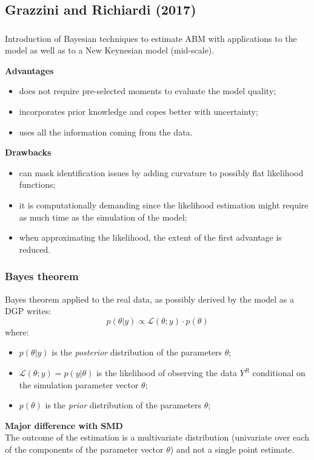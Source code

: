 \documentclass[10pt]{beamer}
\begin{document}
\subsection{Grazzini and Richiardi (2017)}


\begin{frame}[c]\frametitle{\citet{grazzini2017bayesian}}
	Introduction of Bayesian techniques to estimate ABM with applications to the \citet{cliff1997minimal} model as well as to a New Keynesian model (mid-scale). \bigskip

	\alert{\textbf{Advantages}}
	\begin{itemize}
		\item does not require pre-selected moments to evaluate the model quality;
		\item incorporates prior knowledge and copes better with uncertainty;
		\item uses all the information coming from the data. %
	\end{itemize}

	\alert{\textbf{Drawbacks}}
	\begin{itemize}
		\item can mask identification issues by adding curvature to possibly flat likelihood functions;
		\item it is computationally demanding since the likelihood estimation might require as much time as the simulation of the model;
		\item when approximating the likelihood, the extent of the first advantage is reduced.
	\end{itemize}
\end{frame}


\begin{frame}[c]\frametitle{Bayes theorem}
	Bayes theorem applied to the real data, as possibly derived by the model as a DGP writes:
    \begin{equation} \label{eq:bayes}
    	p(\theta | y) \propto \mathcal{L}(\theta; y) \cdot p(\theta)
    \end{equation}
	where:
	\begin{itemize}
		\item $p(\theta | y)$ is the \emph{posterior} distribution of the parameters $\theta$;
		\item $\mathcal{L}(\theta; y) = p(y | \theta)$ is the likelihood of observing the data $Y^{R}$ conditional on the simulation parameter vector $\theta$;
		\item $p(\theta)$ is the \emph{prior} distribution of the parameters $\theta$;
	\end{itemize} \bigskip

	\alert{\textbf{Major difference with SMD}}
	\\ The outcome of the estimation is a multivariate distribution (univariate over each of the components of the parameter vector $\theta$) and not a single point estimate.
\end{frame}
\end{document}

